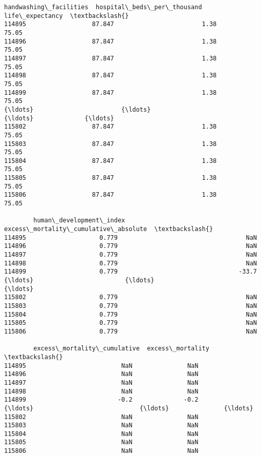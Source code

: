 \documentclass[11pt]{article}
\begin{document}
\begin{tcolorbox}[breakable, size=fbox, boxrule=.5pt, pad at break*=1mm, opacityfill=0]
\begin{Verbatim}[commandchars=\\\{\}]
        handwashing\_facilities  hospital\_beds\_per\_thousand  life\_expectancy  \textbackslash{}
114895                  87.847                        1.38            75.05
114896                  87.847                        1.38            75.05
114897                  87.847                        1.38            75.05
114898                  87.847                        1.38            75.05
114899                  87.847                        1.38            75.05
{\ldots}                        {\ldots}                         {\ldots}              {\ldots}
115802                  87.847                        1.38            75.05
115803                  87.847                        1.38            75.05
115804                  87.847                        1.38            75.05
115805                  87.847                        1.38            75.05
115806                  87.847                        1.38            75.05

        human\_development\_index  excess\_mortality\_cumulative\_absolute  \textbackslash{}
114895                    0.779                                   NaN
114896                    0.779                                   NaN
114897                    0.779                                   NaN
114898                    0.779                                   NaN
114899                    0.779                                 -33.7
{\ldots}                         {\ldots}                                   {\ldots}
115802                    0.779                                   NaN
115803                    0.779                                   NaN
115804                    0.779                                   NaN
115805                    0.779                                   NaN
115806                    0.779                                   NaN

        excess\_mortality\_cumulative  excess\_mortality  \textbackslash{}
114895                          NaN               NaN
114896                          NaN               NaN
114897                          NaN               NaN
114898                          NaN               NaN
114899                         -0.2              -0.2
{\ldots}                             {\ldots}               {\ldots}
115802                          NaN               NaN
115803                          NaN               NaN
115804                          NaN               NaN
115805                          NaN               NaN
115806                          NaN               NaN


\end{Verbatim}
\end{tcolorbox}
\end{document}
